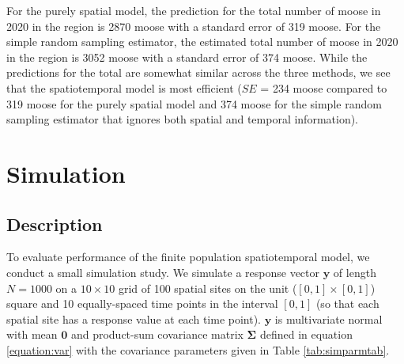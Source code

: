\documentclass[]{interact}
\theoremstyle{plain}%
\theoremstyle{definition}
\theoremstyle{remark}
\begin{document}
For the purely spatial model, the prediction for the total number of
moose in 2020 in the region is 2870 moose with a standard error of 319
moose. For the simple random sampling estimator, the estimated total
number of moose in 2020 in the region is 3052 moose with a standard
error of 374 moose. While the predictions for the total are somewhat
similar across the three methods, we see that the spatiotemporal model
is most efficient (\(SE\) = 234 moose compared to 319 moose for the
purely spatial model and 374 moose for the simple random sampling
estimator that ignores both spatial and temporal information).

\section{Simulation} \label{section:Simulation}

\subsection{Description}

To evaluate performance of the finite population spatiotemporal model,
we conduct a small simulation study. We simulate a response vector
\(\mathbf{y}\) of length \(N = 1000\) on a \(10 \times 10\) grid of 100
spatial sites on the unit (\([0, 1] \times [0, 1]\)) square and 10
equally-spaced time points in the interval \([0, 1]\) (so that each
spatial site has a response value at each time point). \(\mathbf{y}\) is
multivariate normal with mean \(\mathbf{0}\) and product-sum covariance
matrix \(\bm{\Sigma}\) defined in equation \ref{equation:var} with the
covariance parameters given in Table \ref{tab:simparmtab}.
\end{document}
